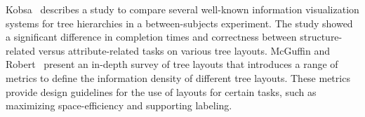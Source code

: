 \documentclass[a4paper]{llncs}
\begin{document}
Kobsa~\cite{Kobsa2004UserExperiments} describes a study to compare several well-known information visualization systems for tree hierarchies in a between-subjects experiment. The study showed a significant difference in completion times and correctness between structure-related versus attribute-related tasks on various tree layouts. McGuffin and Robert~\cite{McGuffin2010Trees} present an in-depth survey of tree layouts that introduces a range of metrics to define the information density of different tree layouts. These metrics provide design guidelines for the use of layouts for certain tasks, such as maximizing space-efficiency and supporting labeling.





\end{document}

